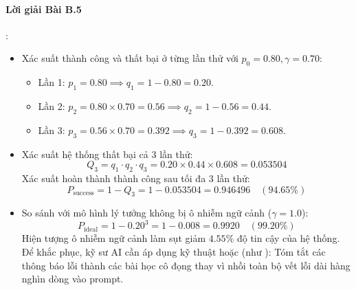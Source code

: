 \paragraph{Lời giải Bài B.5}:
\begin{itemize}
  \item[a)] Xác suất thành công và thất bại ở từng lần thử với $p_0 = 0.80, \gamma = 0.70$:
  \begin{itemize}
    \item Lần 1: $p_1 = 0.80 \implies q_1 = 1 - 0.80 = 0.20$.
    \item Lần 2: $p_2 = 0.80 \times 0.70 = 0.56 \implies q_2 = 1 - 0.56 = 0.44$.
    \item Lần 3: $p_3 = 0.56 \times 0.70 = 0.392 \implies q_3 = 1 - 0.392 = 0.608$.
  \end{itemize}

  \item[b)] Xác suất hệ thống thất bại cả 3 lần thử:
  \begin{equation*}
  Q_3 = q_1 \cdot q_2 \cdot q_3 = 0.20 \times 0.44 \times 0.608 = 0.053504
  \end{equation*}
  Xác suất hoàn thành thành công sau tối đa 3 lần thử:
  \begin{equation*}
  P_{\text{success}} = 1 - Q_3 = 1 - 0.053504 = 0.946496 \quad (\mathbf{94.65\%})
  \end{equation*}

  \item[c)] So sánh với mô hình lý tưởng không bị ô nhiễm ngữ cảnh ($\gamma = 1.0$):
  \begin{equation*}
  P_{\text{ideal}} = 1 - 0.20^3 = 1 - 0.008 = 0.9920 \quad (\mathbf{99.20\%})
  \end{equation*}
  Hiện tượng ô nhiễm ngữ cảnh làm sụt giảm $4.55\%$ độ tin cậy của hệ thống. Để khắc phục, kỹ sư AI cần áp dụng kỹ thuật  hoặc  (như ): Tóm tắt các thông báo lỗi thành các bài học cô đọng thay vì nhồi toàn bộ vết lỗi dài hàng nghìn dòng vào prompt.
\end{itemize}


